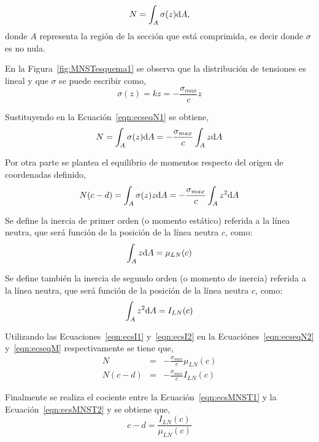 \begin{equation}
N = \int_{A} \sigma (z) {\text{d}} A \label{eqn:ecseqN1},
\end{equation}
%
donde $A$ representa la región de la sección que está comprimida, es decir donde $\sigma$ es no nula.

En la Figura~\ref{fig:MNSTesquema1} se observa que la distribución de tensiones es lineal y que $\sigma$ se puede escribir como,
\begin{equation}
\sigma(z) = kz = -\frac{\sigma_{max}}{c} z
\end{equation}

Sustituyendo en la Ecuación~\eqref{eqn:ecseqN1} se obtiene,
\begin{equation}
N = \int_{A} \sigma(z) {\text{d}} A=-\frac{\sigma_{max}}{c} \int_{A} z {\text{d}} A \label{eqn:ecseqN2}
\end{equation}

Por otra parte se plantea el equilibrio de momentos respecto del origen de coordenadas definido,
\begin{equation}
N(c-d) = \int_{A} \sigma(z) z {\text{d}} A = -\frac{\sigma_{max}}{c} \int_{A} z^2 {\text{d}} A \label{eqn:ecseqM}
\end{equation}

Se define la inercia de primer orden (o momento estático) referida a la línea neutra, que será función de la posición de la línea neutra $c$, como:
\begin{equation}
\int_{A} z {\text{d}} A = \mu_{LN}(c) \label{eqn:ecsI1}
\end{equation}

Se define también la inercia de segundo orden (o momento de inercia) referida a la línea neutra, que será función de la posición de la línea neutra $c$, como:
\begin{equation}
\int_{A} z^2 {\text{d}} A = I_{LN}(c) \label{eqn:ecsI2}
\end{equation}

Utilizando las Ecuaciones~\eqref{eqn:ecsI1} y~\eqref{eqn:ecsI2} en la Ecuaciónes~\eqref{eqn:ecseqN2} y~\eqref{eqn:ecseqM} respectivamente se tiene que,
\begin{eqnarray}
N &=& - \frac{\sigma_{max}}{c} \mu_{LN}(c)\label{eqn:ecsMNST1} \\
N(c-d) &=& - \frac{\sigma_{max}}{c} I_{LN}(c) \label{eqn:ecsMNST2}
\end{eqnarray}

Finalmente se realiza el cociente entre la Ecuación~\eqref{eqn:ecsMNST1} y la Ecuación~\eqref{eqn:ecsMNST2} y se obtiene que,
\begin{equation}
c-d = \frac{I_{LN}(c)}{\mu_{LN}(c)} \label{eqn:ecsMNST}
\end{equation}

